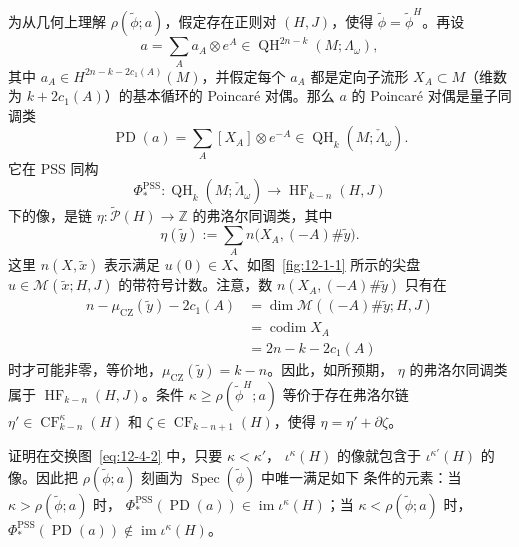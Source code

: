为从几何上理解 $\rho(\widetilde\phi;a)$，假定存在正则对 $(H,J)$，使得
$\widetilde\phi=\widetilde\phi^H$。再设
\[
  a=\sum_Aa_A\otimes e^A
  \in\operatorname{QH}^{2n-k}(M;\Lambda_\omega),
\]
其中 $a_A\in H^{2n-k-2c_1(A)}(M)$，并假定每个 $a_A$ 都是定向子流形
$X_A\subset M$（维数为 $k+2c_1(A)$）的基本循环的 Poincaré 对偶。那么 $a$ 的
Poincaré 对偶是量子同调类
\[
  \operatorname{PD}(a)=\sum_A[X_A]\otimes e^{-A}
  \in\operatorname{QH}_k(M;\check\Lambda_\omega).
\]
它在 PSS 同构
\[
  \Phi_*^{\mathrm{PSS}}:\operatorname{QH}_k(M;\check\Lambda_\omega)
  \longrightarrow\operatorname{HF}_{k-n}(H,J)
\]
下的像，是链 $\eta:\widetilde{\mathcal P}(H)\to\mathbb Z$ 的弗洛尔同调类，其中
\begin{equation}\label{eq:12-4-4}
  \eta(\widetilde y):=\sum_A n\bigl(X_A,(-A)\#\widetilde y\bigr).
\end{equation}
这里 $n(X,\widetilde x)$ 表示满足 $u(0)\in X$、如图~\ref{fig:12-1-1} 所示的尖盘
$u\in\mathcal M(\widetilde x;H,J)$ 的带符号计数。注意，数
$n(X_A,(-A)\#\widetilde y)$ 只有在
\[
\begin{aligned}
  n-\mu_{\mathrm{CZ}}(\widetilde y)-2c_1(A)
  &=\dim\mathcal M((-A)\#\widetilde y;H,J)\\
  &=\operatorname{codim}X_A\\
  &=2n-k-2c_1(A)
\end{aligned}
\]
时才可能非零，等价地，$\mu_{\mathrm{CZ}}(\widetilde y)=k-n$。因此，如所预期，
$\eta$ 的弗洛尔同调类属于 $\operatorname{HF}_{k-n}(H,J)$。条件
$\kappa\ge\rho(\widetilde\phi^H;a)$ 等价于存在弗洛尔链
$\eta'\in\operatorname{CF}_{k-n}^\kappa(H)$ 和
$\zeta\in\operatorname{CF}_{k-n+1}(H)$，使得 $\eta=\eta'+\partial\zeta$。

\begin{exercise}\label{ex:12-4-3}
证明在交换图~\eqref{eq:12-4-2} 中，只要 $\kappa<\kappa'$，
$\iota^\kappa(H)$ 的像就包含于 $\iota^{\kappa'}(H)$ 的像。因此把
$\rho(\widetilde\phi;a)$ 刻画为 $\operatorname{Spec}(\widetilde\phi)$ 中唯一满足如下
条件的元素：当 $\kappa>\rho(\widetilde\phi;a)$ 时，
$\Phi_*^{\mathrm{PSS}}(\operatorname{PD}(a))\in\operatorname{im}\iota^\kappa(H)$；当
$\kappa<\rho(\widetilde\phi;a)$ 时，
$\Phi_*^{\mathrm{PSS}}(\operatorname{PD}(a))\notin\operatorname{im}\iota^\kappa(H)$。
\end{exercise}

